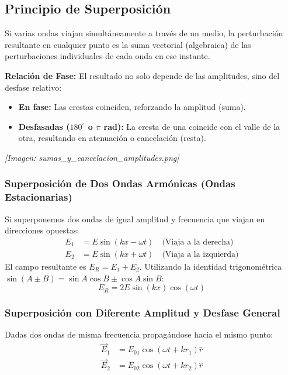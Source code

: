 \documentclass[12pt]{article}
\begin{document}
	\subsection{Principio de Superposición}
	Si varias ondas viajan simultáneamente a través de un medio, la perturbación resultante en cualquier punto es la suma vectorial (algebraica) de las perturbaciones individuales de cada onda en ese instante.
	
	\textbf{Relación de Fase:}
	El resultado no solo depende de las amplitudes, sino del desfase relativo:
	\begin{itemize}
		\item \textbf{En fase:} Las crestas coinciden, reforzando la amplitud (suma).
		\item \textbf{Desfasadas ($180^\circ$ o $\pi$ rad):} La cresta de una coincide con el valle de la otra, resultando en atenuación o cancelación (resta).
	\end{itemize}
	\textit{[Imagen: sumas\_y\_cancelacion\_amplitudes.png]}
	
	\subsubsection*{Superposición de Dos Ondas Armónicas (Ondas Estacionarias)}
	Si superponemos dos ondas de igual amplitud y frecuencia que viajan en direcciones opuestas:
	\begin{align*}
		E_1 &= E\sin(kx - \omega t) \quad \text{(Viaja a la derecha)} \\
		E_2 &= E\sin(kx + \omega t) \quad \text{(Viaja a la izquierda)}
	\end{align*}
	El campo resultante es $E_R = E_1 + E_2$. Utilizando la identidad trigonométrica $\sin(A\pm B) = \sin A \cos B \pm \cos A \sin B$:
	\begin{equation*}
		E_R = 2E\sin(kx)\cos(\omega t)
	\end{equation*}
	
	\subsubsection*{Superposición con Diferente Amplitud y Desfase General}
	Dadas dos ondas de misma frecuencia propagándose hacia el mismo punto:
	\begin{align*}
		\vec{E}_1 &= E_{01}\cos(\omega t + kr_1)\hat{r} \\
		\vec{E}_2 &= E_{02}\cos(\omega t + kr_2)\hat{r}
	\end{align*}
	
\end{document}
